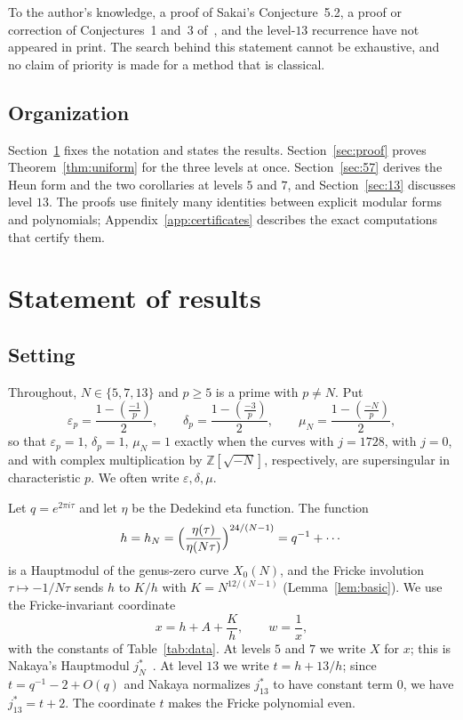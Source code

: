 \documentclass[11pt,a4paper]{article}
\theoremstyle{definition}
\theoremstyle{remark}
\newcommand{\Z}{\mathbb{Z}}
\newcommand{\leg}[2]{\left(\frac{#1}{#2}\right)}
\numberwithin{equation}{section}
\begin{document}
To the author's knowledge, a proof of Sakai's Conjecture~5.2, a proof or
correction of Conjectures~1 and~3 of~\cite{Nakaya19}, and the level-$13$
recurrence have not appeared in print. The search behind this statement cannot
be exhaustive, and no claim of priority is made for a method that is classical.

\subsection*{Organization}
Section~\ref{sec:results} fixes the notation and states the results.
Section~\ref{sec:proof} proves Theorem~\ref{thm:uniform} for the three levels
at once. Section~\ref{sec:57} derives the Heun form and the two corollaries at
levels $5$ and $7$, and Section~\ref{sec:13} discusses level $13$. The proofs
use finitely many identities between explicit modular forms and polynomials;
Appendix~\ref{app:certificates} describes the exact computations that certify
them.

\section{Statement of results}\label{sec:results}

\subsection{Setting}\label{subsec:setting}

Throughout, $N\in\{5,7,13\}$ and $p\ge5$ is a prime with $p\ne N$. Put
\[
\varepsilon_p=\frac{1-\leg{-1}{p}}2,\qquad
\delta_p=\frac{1-\leg{-3}{p}}2,\qquad
\mu_N=\frac{1-\leg{-N}{p}}2 ,
\]
so that $\varepsilon_p=1$, $\delta_p=1$, $\mu_N=1$ exactly when the curves
with $j=1728$, with $j=0$, and with complex multiplication by $\Z[\sqrt{-N}]$,
respectively, are supersingular in characteristic $p$. We often write
$\varepsilon,\delta,\mu$.

Let $q=e^{2\pi i\tau}$ and let $\eta$ be the Dedekind eta function. The
function
\[
h=h_N=\Bigl(\frac{\eta(\tau)}{\eta(N\tau)}\Bigr)^{24/(N-1)}=q^{-1}+\cdots
\]
is a Hauptmodul of the genus-zero curve $X_0(N)$, and the Fricke involution
$\tau\mapsto-1/N\tau$ sends $h$ to $K/h$ with $K=N^{12/(N-1)}$
(Lemma~\ref{lem:basic}). We use the Fricke-invariant coordinate
\[
x=h+A+\frac Kh ,\qquad w=\frac1x ,
\]
with the constants of Table~\ref{tab:data}. At levels $5$ and $7$ we write
$X$ for $x$; this is Nakaya's Hauptmodul $j_N^*$~\cite[p.~485]{Nakaya19}. At
level $13$ we write $t=h+13/h$; since $t=q^{-1}-2+O(q)$ and Nakaya normalizes
$j_{13}^*$ to have constant term $0$, we have $j_{13}^*=t+2$. The coordinate
$t$ makes the Fricke polynomial even.
\end{document}
